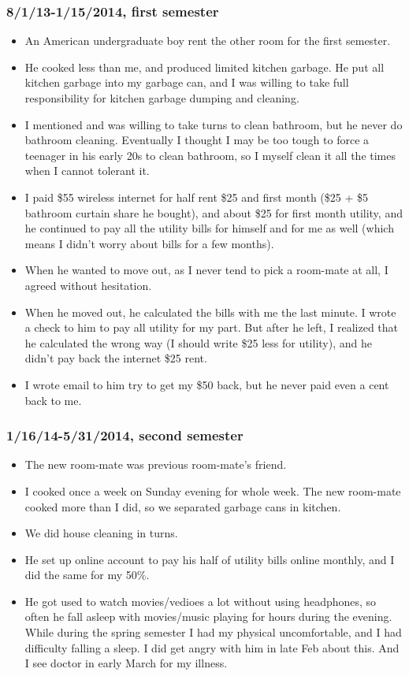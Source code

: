 \documentclass[9pt,b5paper]{article}
\begin{document}
\subsubsection{8/1/13-1/15/2014, first semester}
\label{sec-2-2-1}
\begin{itemize}
\item An American undergraduate boy rent the other room for the first semester.
\item He cooked less than me, and produced limited kitchen garbage. He put all kitchen garbage into my garbage can, and I was willing to take full responsibility for kitchen garbage dumping and cleaning.
\item I mentioned and was willing to take turns to clean bathroom, but he never do bathroom cleaning. Eventually I thought I may be too tough to force a teenager in his early 20s to clean bathroom, so I myself clean it all the times when I cannot tolerant it.
\item I paid \$55 wireless internet for half rent \$25 and first month (\$25 + \$5 bathroom curtain share he bought), and about \$25 for first month utility, and he continued to pay all the utility bills for himself and for  me as well (which means I didn't worry about bills for a few months).
\item When he wanted to move out, as I never tend to pick a room-mate at all, I agreed without hesitation.
\item When he moved out, he calculated the bills with me the last minute. I wrote a check to him to pay all utility for my part. But after he left, I realized that he calculated the wrong way (I should write \$25 less for utility), and he didn't pay back the internet \$25 rent.
\item I wrote email to him try to get my \$50 back, but he never paid even a cent back to me.
\end{itemize}
\subsubsection{1/16/14-5/31/2014, second semester}
\label{sec-2-2-2}
\begin{itemize}
\item The new room-mate was previous room-mate's friend.
\item I cooked once a week on Sunday evening for whole week. The new room-mate cooked more than I did, so we separated garbage cans in kitchen.
\item We did house cleaning in turns.
\item He set up online account to pay his half of utility bills online monthly, and I did the same for my 50\%.
\item He got used to watch movies/vedioes a lot without using headphones, so often he fall asleep with movies/music playing for hours during the evening. While during the spring semester I had my physical uncomfortable, and I had difficulty falling a sleep. I did get angry with him in late Feb about this. And I see doctor in early March for my illness.
\end{itemize}
\end{document}
